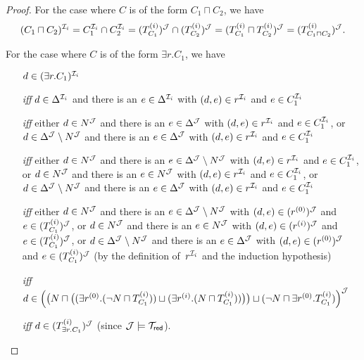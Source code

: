 \begin{proof}
    \noindent
    For the case where $C$ is of the form $C_1\sqcap C_2$, we have
    \[(C_1\sqcap C_2)^{\Imc_i}%
        =C_1^{\Imc_i}\cap C_2^{\Imc_i}%
        =(T_{C_1}^{(i)})^\Jmc\cap(T_{C_2}^{(i)})^\Jmc%
        =(T_{C_1}^{(i)}\sqcap T_{C_2}^{(i)})^\Jmc%
        =(T_{C_1\sqcap C_2}^{(i)})^\Jmc.\]

    \noindent
    For the case where $C$ is of the form $\exists r.C_1$, we have
    \begin{itemize}
        \item[]
            $d\in(\exists r.C_1)^{\mathcal{I}_i}$
        \item[\emph{iff}]
            $d\in\Delta^{\mathcal{I}_i}$ and there is an $e\in\Delta^{\mathcal{I}_i}$ with
            $(d,e)\in r^{\mathcal{I}_i}$ and $e\in C_1^{\mathcal{I}_i}$
        \item[\emph{iff}]
            either $d\in N^\mathcal{J}$ and there is an $e\in\Delta^\mathcal{J}$ with
            $(d,e)\in r^{\mathcal{I}_i}$ and $e\in C_1^{\mathcal{I}_i}$, or
            $d\in\Delta^\mathcal{J}\setminus N^\mathcal{J}$ and there is an $e\in\Delta^\mathcal{J}$
            with $(d,e)\in r^{\mathcal{I}_i}$ and $e\in C_1^{\mathcal{I}_i}$
        \item[\emph{iff}]
            either $d\in N^\mathcal{J}$ and there is an
            $e\in\Delta^\mathcal{J}\setminus N^\mathcal{J}$ with
            $(d,e)\in r^{\mathcal{I}_i}$ and $e\in C_1^{\mathcal{I}_i}$, or
            $d\in N^\mathcal{J}$ and there is an $e\in N^\mathcal{J}$ with
            $(d,e)\in r^{\mathcal{I}_i}$ and $e\in C_1^{\mathcal{I}_i}$, or
            $d\in\Delta^\mathcal{J}\setminus N^\mathcal{J}$ and there is an $e\in\Delta^\mathcal{J}$
            with $(d,e)\in r^{\mathcal{I}_i}$ and $e\in C_1^{\mathcal{I}_i}$
        \item[\emph{iff}]
            either $d\in N^\mathcal{J}$ and there is an
            $e\in\Delta^\mathcal{J}\setminus N^\mathcal{J}$ with
            $(d,e)\in(r^{(0)})^\mathcal{J}$ and $e\in(T_{C_1}^{(i)})^\mathcal{J}$, or
            $d\in N^\mathcal{J}$ and there is an $e\in N^\mathcal{J}$ with
            $(d,e)\in(r^{(i)})^\mathcal{J}$ and $e\in(T_{C_1}^{(i)})^\mathcal{J}$, or
            $d\in\Delta^\mathcal{J}\setminus N^\mathcal{J}$ and there is an $e\in\Delta^\mathcal{J}$
            with $(d,e)\in(r^{(0)})^\mathcal{J}$ and $e\in(T_{C_1}^{(i)})^\mathcal{J}$
            (by the definition of~$r^{\mathcal{I}_i}$ and the induction hypothesis)
        \item[\emph{iff}]
            $d\in\Bigl(\bigl(N\sqcap\bigl(%
                (\exists r^{(0)}.(\lnot N\sqcap T_{C_1}^{(i)}))\sqcup%
                (\exists r^{(i)}.(N\sqcap T_{C_1}^{(i)}))\bigr)\bigr)\sqcup%
                (\lnot N\sqcap\exists r^{(0)}.T_{C_1}^{(i)})\Bigr)^\Jmc$
        \item[\emph{iff}]
            $d\in(T_{\exists r.C_1}^{(i)})^\mathcal{J}$ (since $\mathcal{J}\models\mathcal{T}_\mathsf{red}$).
    \end{itemize}


\end{proof}
